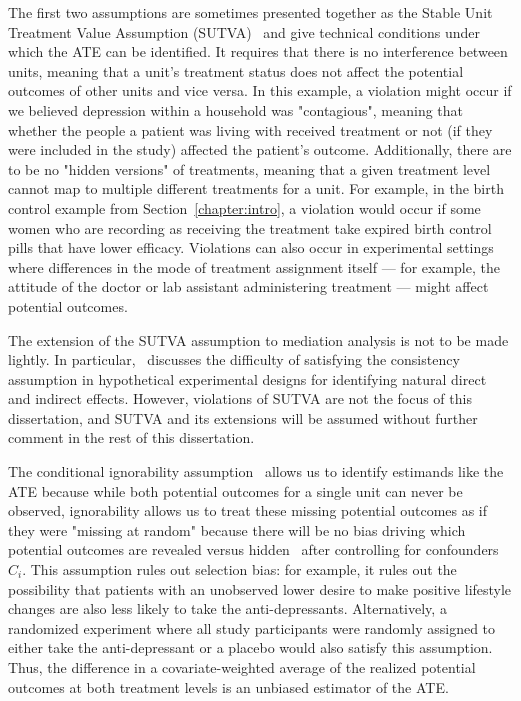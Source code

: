 The first two assumptions are sometimes presented together as the Stable Unit Treatment Value Assumption 
(SUTVA)~\citep{rubin1980a} and give technical conditions under which
the ATE can be identified. It requires that there is no interference between units, meaning that a unit's 
treatment status does not affect the potential outcomes of other units and vice versa. In this example, a violation
might occur if we believed depression within a household was "contagious", meaning that whether the people a patient
was living with received treatment or not (if they were included in the study) affected the patient's outcome.  
Additionally, there are to be no "hidden versions" of treatments, meaning that a given treatment 
level cannot map to multiple different treatments for a unit. For example, in the birth control example from 
Section~\ref{chapter:intro}, a violation would occur if some women who are recording as receiving the treatment take
expired birth control pills that have lower efficacy. Violations can also occur in experimental settings where differences
in the mode of treatment assignment itself --- for example, the attitude of the doctor or lab assistant administering 
treatment --- might affect potential outcomes.

The extension of the SUTVA assumption to mediation analysis is not to be made lightly. In particular,~\cite{imaietal2013} 
discusses the difficulty of satisfying the consistency assumption in hypothetical 
experimental designs for identifying natural direct and indirect effects. However, violations of SUTVA are not 
the focus of this dissertation, and SUTVA and its extensions will be assumed without further comment 
in the rest of this dissertation. 

The conditional ignorability assumption~\citep{rubin1978} allows us to identify estimands like the ATE because while both 
potential outcomes for a single unit can never be observed, ignorability allows us to treat these missing potential 
outcomes as if they were "missing at random" because there will be no bias driving which potential outcomes are revealed
versus hidden~\citep{imbens2015} after controlling for confounders $C_{i}$. This assumption
rules out selection bias: for example, it rules out the possibility that patients with an unobserved lower desire to 
make positive lifestyle changes are also less likely to take the anti-depressants. Alternatively, a randomized experiment
where all study participants were randomly assigned to either take the anti-depressant or a placebo would also satisfy 
this assumption. Thus, the difference in a covariate-weighted average of the realized potential outcomes at both
treatment levels is an unbiased estimator of the ATE.

